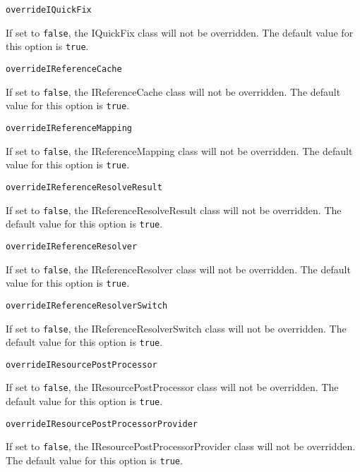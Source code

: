 \noindent\texttt{overrideIQuickFix}
\begin{myindentpar}{1cm}
If set to \texttt{false}, the IQuickFix class will not be overridden. The default value for this option is \texttt{true}.
\end{myindentpar}

\noindent\texttt{overrideIReferenceCache}
\begin{myindentpar}{1cm}
If set to \texttt{false}, the IReferenceCache class will not be overridden. The default value for this option is \texttt{true}.
\end{myindentpar}

\noindent\texttt{overrideIReferenceMapping}
\begin{myindentpar}{1cm}
If set to \texttt{false}, the IReferenceMapping class will not be overridden. The default value for this option is \texttt{true}.
\end{myindentpar}

\noindent\texttt{overrideIReferenceResolveResult}
\begin{myindentpar}{1cm}
If set to \texttt{false}, the IReferenceResolveResult class will not be overridden. The default value for this option is \texttt{true}.
\end{myindentpar}

\noindent\texttt{overrideIReferenceResolver}
\begin{myindentpar}{1cm}
If set to \texttt{false}, the IReferenceResolver class will not be overridden. The default value for this option is \texttt{true}.
\end{myindentpar}

\noindent\texttt{overrideIReferenceResolverSwitch}
\begin{myindentpar}{1cm}
If set to \texttt{false}, the IReferenceResolverSwitch class will not be overridden. The default value for this option is \texttt{true}.
\end{myindentpar}

\noindent\texttt{overrideIResourcePostProcessor}
\begin{myindentpar}{1cm}
If set to \texttt{false}, the IResourcePostProcessor class will not be overridden. The default value for this option is \texttt{true}.
\end{myindentpar}

\noindent\texttt{overrideIResourcePostProcessorProvider}
\begin{myindentpar}{1cm}
If set to \texttt{false}, the IResourcePostProcessorProvider class will not be overridden. The default value for this option is \texttt{true}.
\end{myindentpar}

